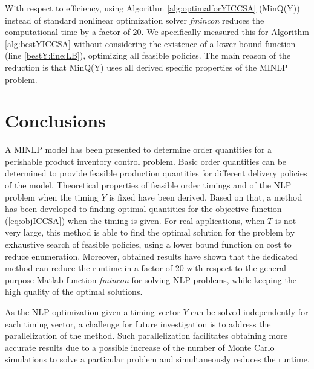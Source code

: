{With respect to efficiency, using Algorithm \ref{alg:optimalforYICCSA} (MinQ(Y)) instead of standard nonlinear optimization solver \emph{fmincon} reduces the computational time by a factor of 20. We specifically measured this for  Algorithm \ref{alg:bestYICCSA} without considering the existence of a lower bound function (line \ref{bestY:line:LB}), optimizing all feasible policies.  The main reason of the reduction is that MinQ(Y) uses all derived specific properties of the MINLP problem. 



\section{Conclusions}
\label{sec:conclusionsICCSA}
A MINLP model has been presented to determine order quantities for a perishable product inventory control problem. Basic order quantities can be determined to provide feasible production quantities for different delivery policies of the model. Theoretical properties of feasible order timings and of the NLP problem when the timing $Y$ is fixed have been derived. Based on that, a method has been developed to finding optimal quantities for the objective function (\ref{eq:objICCSA}) when the timing is given. For real applications, when $T$ is not very large, this method is able to find the optimal solution for the problem by exhaustive search of feasible policies, using a lower bound function on cost to reduce enumeration.
Moreover, obtained results have shown that the dedicated  method can reduce the runtime in a factor of $20$ with respect to the general purpose Matlab function \emph{fmincon} for solving NLP problems, while keeping the high quality of the optimal solutions.


As the NLP optimization given a timing vector $Y$ can be solved independently for each timing vector, a challenge for future investigation is to address the parallelization of the method. Such parallelization facilitates obtaining more accurate results due to a possible  increase of the number of Monte Carlo simulations to solve a particular problem and simultaneously reduces the runtime.








}
